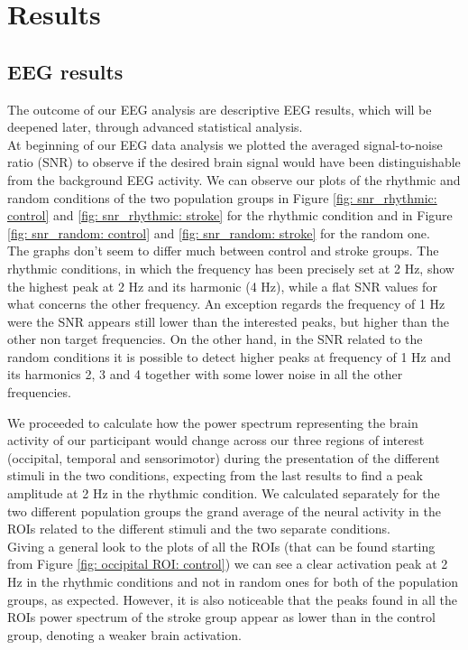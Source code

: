 \chapter{Results}
\section{EEG results}
The outcome of our EEG analysis are descriptive EEG results, which will be deepened later, through advanced statistical analysis.\\ 
At beginning of our EEG data analysis we plotted the averaged signal-to-noise ratio (SNR) to observe if the desired brain signal would have been distinguishable from the background EEG activity. We can observe our plots of the rhythmic and random conditions of the two population groups in Figure \ref{fig: snr_rhythmic: control} and \ref{fig: snr_rhythmic: stroke} for the rhythmic condition and in Figure \ref{fig: snr_random: control} and \ref{fig: snr_random: stroke} for the random one. \\
The graphs don't seem to differ much between control and stroke groups.  The rhythmic conditions, in which the frequency has been precisely set at 2 Hz, show the highest peak at 2 Hz and its harmonic (4 Hz), while a flat SNR values for what concerns the other frequency. An exception regards the frequency of 1 Hz were the SNR appears still lower than the interested peaks, but higher than the other non target frequencies. On the other hand, in the SNR related to the random conditions it is possible to detect higher peaks at frequency of 1 Hz and its harmonics 2, 3 and 4 together with some lower noise in all the other frequencies. 

We proceeded to calculate how the power spectrum representing the brain activity of our participant would change across our three regions of interest (occipital, temporal and sensorimotor) during the presentation of the different stimuli in the two conditions, expecting from the last results to find a peak amplitude at 2 Hz in the rhythmic condition. We calculated separately for the two different population groups the grand average of the neural activity in the ROIs related to the different stimuli and the two separate conditions. \\
Giving a general look to the plots of all the ROIs (that can be found starting from Figure \ref{fig: occipital ROI: control}) we can see a clear activation peak at 2 Hz in the rhythmic conditions and not in random ones for both of the population groups, as expected. However, it is also noticeable that the peaks found in all the ROIs power spectrum of the stroke group appear as lower than in the control group, denoting a weaker brain activation.  

